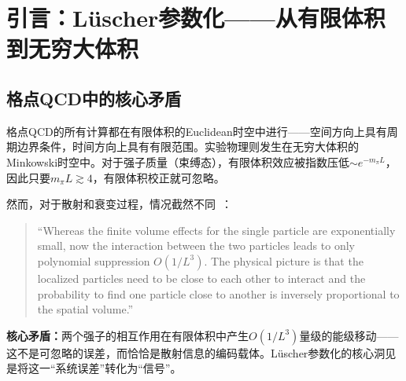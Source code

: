 \documentclass[12pt,a4paper]{ctexart}
\theoremstyle{definition}
\begin{document}
\begin{abstract}
\textbf{第六维度——Lellouch--L\"uscher关系：$K\to\pi\pi$衰变（§7）：}
阐述Lellouch和L\"uscher如何将这一框架推广到弱衰变矩阵元——建立有限体积中的$K\to\pi\pi$矩阵元与无穷大体积物理衰变振幅之间的精确关系，这是格点上$\epsilon'/\epsilon$和CP破坏计算的理论基石。

\textbf{第七维度——耦合道推广与宽共振（§8）：}
讨论L\"uscher方法在非弹性阈值以上的耦合道推广、$\sigma/f_0(500)$等极宽共振的挑战、以及Hansen--Sharpe等现代化的有限体积形式体系。

\textbf{第八维度——L\"uscher在梯度流重整化中的贡献（§9）：}
作为L\"uscher对格点QCD贡献的补充，简述他在梯度流（gradient flow）理论中的奠基性工作——L\"uscher--Weisz定理（2011）证明了梯度流关联函数的UV有限性——及其与有限体积方法的``族谱''关系。
\end{abstract}

\tableofcontents
\newpage

\section{引言：L\"uscher参数化——从有限体积到无穷大体积}

\subsection{格点QCD中的核心矛盾}

格点QCD的所有计算都在有限体积的Euclidean时空中进行——空间方向上具有周期边界条件，时间方向上具有有限范围。实验物理则发生在无穷大体积的Minkowski时空中。对于强子质量（束缚态），有限体积效应被指数压低$\sim e^{-m_\pi L}$，因此只要$m_\pi L \gtrsim 4$，有限体积校正就可忽略。

然而，对于散射和衰变过程，情况截然不同~\cite{GattringerLang2010,decayChannels2026}：
\begin{quote}
``Whereas the finite volume effects for the single particle are exponentially small, now the interaction between the two particles leads to only polynomial suppression $O(1/L^3)$. The physical picture is that the localized particles need to be close to each other to interact and the probability to find one particle close to another is inversely proportional to the spatial volume.''
\end{quote}

\textbf{核心矛盾：}两个强子的相互作用在有限体积中产生$O(1/L^3)$量级的能级移动——这不是可忽略的误差，而恰恰是散射信息的编码载体。L\"uscher参数化的核心洞见是将这一``系统误差''转化为``信号''。
\end{document}
